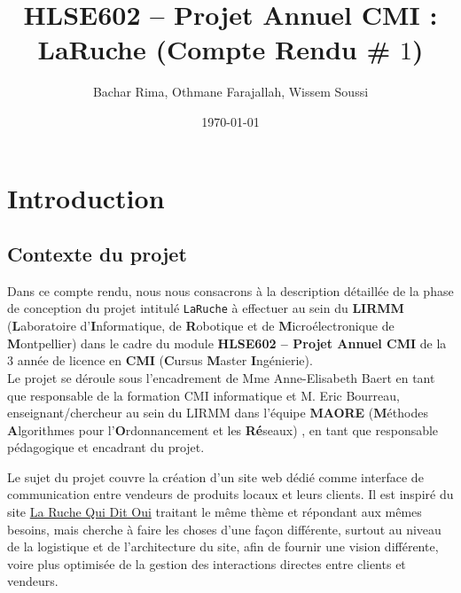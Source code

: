 \documentclass[a4paper,12pt]{book}
\title{\textbf{HLSE602 -- Projet Annuel CMI} : \textbf{LaRuche} (Compte Rendu \# $1$)}
\author{Bachar Rima, Othmane Farajallah, Wissem Soussi}
\date{\today}
\theoremstyle{break}
\theoremstyle{break}
\theoremstyle{definition}
\theoremstyle{remark}
\begin{document}
\pagestyle{plain}

\maketitle

{
  \hypersetup{linkcolor=black}
  \tableofcontents
}

\chapter{Introduction}
\section{Contexte du projet}
Dans ce compte rendu, nous nous consacrons à la description détaillée de la phase de conception du projet intitulé \texttt{LaRuche} à effectuer au sein du \textbf{LIRMM} (\textbf{L}aboratoire d'\textbf{I}nformatique, de \textbf{R}obotique et de \textbf{M}icroélectronique de \textbf{M}ontpellier) dans le cadre du module \textbf{HLSE602 -- Projet Annuel CMI} de la $3$\ieme{} année de licence en \textbf{CMI} (\textbf{C}ursus \textbf{M}aster \textbf{I}ngénierie).\\
Le projet se déroule sous l'encadrement de Mme Anne-Elisabeth Baert en tant que responsable de la formation CMI informatique et M. Eric Bourreau, enseignant/chercheur au sein du LIRMM dans l'équipe \textbf{MAORE} (\textbf{M}éthodes \textbf{A}lgorithmes pour l'\textbf{O}rdonnancement et les \textbf{Ré}seaux) \citep{EricBourreauPres}, en tant que responsable pédagogique et encadrant du projet.

Le sujet du projet couvre la création d'un site web dédié comme interface de communication entre vendeurs de produits locaux et leurs clients. Il est inspiré du site \href{https://laruchequiditoui.fr/fr}{La Ruche Qui Dit Oui} traitant le même thème et répondant aux mêmes besoins, mais cherche à faire les choses d'une façon différente, surtout au niveau de la logistique et de l'architecture du site, afin de fournir une vision différente, voire plus optimisée de la gestion des interactions directes entre clients et vendeurs.
\end{document}
